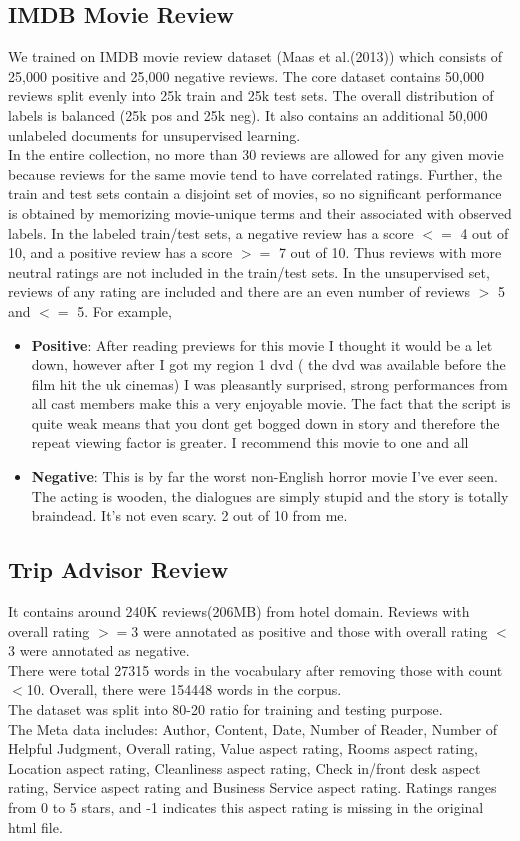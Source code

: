 \subsection{IMDB Movie Review}
We trained on IMDB movie review dataset (Maas et al.(2013)) which consists of 25,000 positive and 25,000 negative reviews. The core dataset contains 50,000 reviews split evenly into 25k train and 25k test sets. The overall distribution of labels is balanced (25k pos and 25k neg). It also contains an additional 50,000 unlabeled documents for unsupervised learning.\\
In the entire collection, no more than 30 reviews are allowed for any given movie because reviews for the same movie tend to have correlated ratings. Further, the train and test sets contain a disjoint set of movies, so no significant performance is obtained by memorizing movie-unique terms and their associated with observed labels.  In the labeled train/test sets, a negative review has a score $<=$ 4 out of 10, and a positive review has a score $>=$ 7 out of 10. Thus reviews with more neutral ratings are not included in the train/test sets. In the unsupervised set, reviews of any rating are included and there are an even number of reviews $>$ 5 and $<=$ 5. For example,
\begin{itemize}
\item \textbf{Positive}: After reading previews for this movie I thought it would be a let down, however after I got my region 1 dvd ( the dvd was available before the film hit the uk cinemas) I was pleasantly surprised, strong performances from all cast members make this a very enjoyable movie. The fact that the script is quite weak means that you dont get bogged down in story and therefore the repeat viewing factor is greater. I recommend this movie to one and all
\item \textbf{Negative}: This is by far the worst non-English horror movie I've ever seen. The acting is wooden, the dialogues are simply stupid and the story is totally braindead. It's not even scary. 2 out of 10 from me.
\end{itemize}

\subsection{Trip Advisor Review}
It contains around 240K reviews(206MB) from hotel domain. Reviews with overall rating $>=$3 were annotated as positive and those with overall rating $<$3 were annotated as negative.\\
There were total 27315 words in the vocabulary after removing those with count $<$10. Overall, there were 154448 words in the corpus.\\
The dataset was split into 80-20 ratio for training and testing purpose.\\
The Meta data includes: Author, Content, Date, Number of Reader, Number of Helpful Judgment, Overall rating, Value aspect rating, Rooms aspect rating, Location aspect rating, Cleanliness aspect rating, Check in/front desk aspect rating, Service aspect rating and Business Service aspect rating. Ratings ranges from 0 to 5 stars, and -1 indicates this aspect rating is missing in the original html file.

